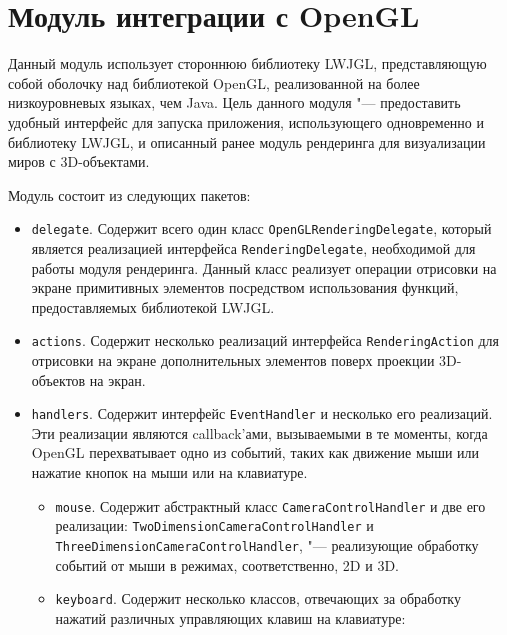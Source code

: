 \section{Модуль интеграции с OpenGL}

Данный модуль использует стороннюю библиотеку LWJGL, представляющую собой оболочку над библиотекой OpenGL, реализованной
на более низкоуровневых языках, чем Java. Цель данного модуля "--- предоставить удобный интерфейс для запуска
приложения, использующего одновременно и библиотеку LWJGL, и описанный ранее модуль рендеринга для визуализации миров с
3D-объектами.

Модуль состоит из следующих пакетов:

\begin{itemize}

\item \texttt{delegate}. Содержит всего один класс \texttt{OpenGLRenderingDelegate}, который является реализацией
интерфейса \texttt{RenderingDelegate}, необходимой для работы модуля рендеринга. Данный класс реализует операции
отрисовки на экране примитивных элементов посредством использования функций, предоставляемых библиотекой LWJGL.

\item \texttt{actions}. Содержит несколько реализаций интерфейса \texttt{RenderingAction} для отрисовки на экране
дополнительных элементов поверх проекции 3D-объектов на экран.

\item \texttt{handlers}. Содержит интерфейс \texttt{EventHandler} и несколько его реализаций. Эти реализации являются
callback'ами, вызываемыми в те моменты, когда OpenGL перехватывает одно из событий, таких как движение мыши или нажатие
кнопок на мыши или на клавиатуре.

    \begin{itemize}

    \item \texttt{mouse}. Содержит абстрактный класс \texttt{CameraControlHandler} и две его реализации:
    \texttt{TwoDimensionCameraControlHandler} и \texttt{ThreeDimensionCamera\-ControlHandler}, "--- реализующие обработку
    событий от мыши в режимах, соответственно, 2D и 3D.

    \item \texttt{keyboard}. Содержит несколько классов, отвечающих за обработку нажатий различных управляющих клавиш на
    клавиатуре:


\end{itemize}
\end{itemize}
